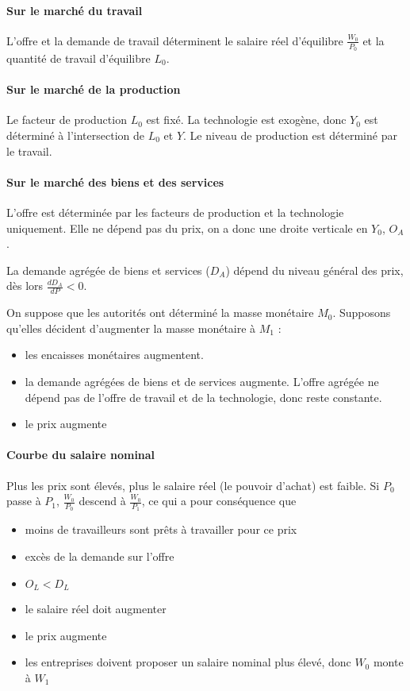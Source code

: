 	
	\paragraph{Sur le marché du travail} L'offre et la demande de travail déterminent le salaire réel d'équilibre $\frac{W_0}{P_0}$ et la quantité de travail d'équilibre $L_0$.
	
	\paragraph{Sur le marché de la production} Le facteur de production $L_0$ est fixé. La technologie est exogène, donc $Y_0$ est déterminé à l'intersection de $L_0$ et $Y$. Le niveau de production est déterminé par le travail.
	
	\paragraph{Sur le marché des biens et des services} L'offre est déterminée par les facteurs de production et la technologie uniquement. Elle ne dépend pas du prix, on a donc une droite verticale en $Y_0$, $O_A$.
	
	La demande agrégée de biens et services ($D_A$) dépend du niveau général des prix, dès lors $\frac{dD_A}{dP} < 0$.
	
	On suppose que les autorités ont déterminé la masse monétaire $M_0$. Supposons qu'elles décident d'augmenter la masse monétaire à $M_1$ :
	
	\begin{itemize}
		\item les encaisses monétaires augmentent.
		\item la demande agrégées de biens et de services augmente. L'offre agrégée ne dépend pas de l'offre de travail et de la technologie, donc reste constante.
		\item le prix augmente
	\end{itemize}
	
	
	\paragraph{Courbe du salaire nominal}
	
	Plus les prix sont élevés, plus le salaire réel (le pouvoir d'achat) est faible. Si $P_0$ passe à $P_1$, $\frac{W_0}{P_0}$ descend à $\frac{W_0}{P_1}$, ce qui a pour conséquence que
	
	\begin{itemize}
		\item moins de travailleurs sont prêts à travailler pour ce prix
		\item excès de la demande sur l'offre
		\item $O_L < D_L$
		\item le salaire réel doit augmenter
		\item le prix augmente
		\item les entreprises doivent proposer un salaire nominal plus élevé, donc $W_0$ monte à $W_1$
	\end{itemize}
	
